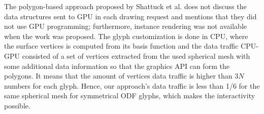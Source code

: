 \documentclass[twoside,twocolumn,10pt]{article}
\begin{document}
The polygon-based approach proposed by Shattuck et al. \cite{shattuck2008} does not discuss the data structures sent to GPU in each drawing request and mentions that they did not use GPU programming; furthermore, instance rendering was not available when the work was proposed. The glyph customization is done in CPU, where the surface vertices is computed from its basis function and the data traffic CPU-GPU consisted of a set of vertices extracted from the used spherical mesh with some additional data information so that the graphics API can form the polygons. It means that the amount of vertices data traffic is higher than $3N$ numbers for each glyph. Hence, our approach's data traffic is less than 1/6 for the same spherical mesh for symmetrical ODF glyphs, which makes the interactivity possible.









\end{document}

